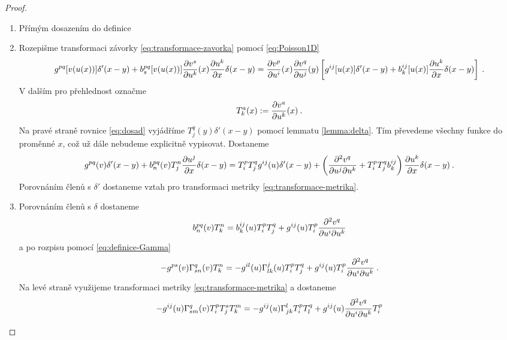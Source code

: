 \begin{proof}
    \begin{enumerate}
        \item Přímým dosazením do definice
        
        \item Rozepišme transformaci závorky \eqref{eq:transformace-zavorka} pomocí \eqref{eq:Poisson1D}
        \begin{align}
            g^{pq}[v(u(x))] \delta'(x-y) + b^{pq}_s[v(u(x))] \frac{\partial v^s}{\partial u^k}(x) \frac{\partial u^k}{\partial x} \delta(x-y)
            = \frac{\partial v^p}{\partial u^i}(x) \frac{\partial v^q}{\partial u^j}(y) \left[ g^{ij}[u(x)] \delta'(x-y) + b^{ij}_k[u(x)] \frac{\partial u^k}{\partial x} \delta(x-y) \right] \:. \label{eq:dosad}
        \end{align}
        V dalším pro přehlednost označme
        \begin{align}
            T^a_k(x) := \frac{\partial v^a}{\partial u^k}(x) \:.
        \end{align}
        Na pravé straně rovnice \eqref{eq:dosad} vyjádříme $T^q_j(y) \delta'(x-y)$ pomocí lemmatu \vref{lemma:delta}. Tím převedeme všechny funkce do proměnné $x$, což už dále nebudeme explicitně vypisovat. Dostaneme
        \begin{align}
            g^{pq}(v) \delta'(x-y) + b^{pq}_n(v) T^n_j \frac{\partial u^j}{\partial x} \delta(x-y) 
            = T^p_i T^q_j g^{ij}(u) \delta'(x-y) 
            + \left( \frac{\partial^2 v^q}{\partial u^j \partial u^k} + T^p_i T^q_j b^{ij}_k \right) \frac{\partial u^k}{\partial x} \delta(x-y) \:.
        \end{align}
        Porovnáním členů s $\delta'$ dostaneme vztah pro transformaci metriky \eqref{eq:transformace-metrika}.
        \item Porovnáním členů s $\delta$ dostaneme
        \begin{align}
            b^{pq}_n(v) T^n_k =
            b^{ij}_k(u) T^p_i T^q_j + g^{ij}(u) T^p_i \frac{\partial^2 v^q}{\partial u^i \partial u^k}
        \end{align}
        a po rozpisu pomocí \eqref{eq:definice-Gamma}
        \begin{align}
            - g^{ps}(v) \Gamma^{q}_{sn}(v) T^n_k =
            - g^{il}(u) \Gamma^j_{lk}(u) T^p_i T^q_j + g^{ij}(u) T^p_i \frac{\partial^2 v^q}{\partial u^i \partial u^k} \:.
        \end{align}
        Na levé straně využijeme transformaci metriky \eqref{eq:transformace-metrika} a dostaneme
        \begin{align}
            -g^{ij}(u) \Gamma^q_{sm}(v) T^p_i T^s_j T^m_k = - g^{ij}(u) \Gamma^l_{jk} T^p_i T^q_l + g^{ij}(u) \ppder{v^q}{u^i}{u^k} T^p_i 

\end{align}
\end{enumerate}
\end{proof}
